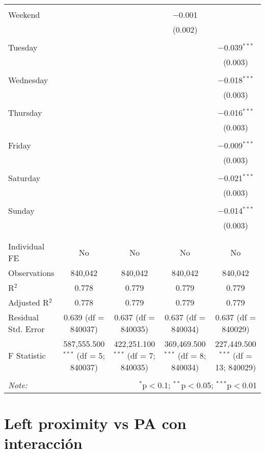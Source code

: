 \documentclass[
]{article}
\begin{document}
\begin{table}[!htbp]
{\begin{tabular}{@{\extracolsep{5pt}}lcccc}
  & & & & \\ 
 Weekend &  &  & $-$0.001 &  \\ 
  &  &  & (0.002) &  \\ 
  & & & & \\ 
 Tuesday &  &  &  & $-$0.039$^{***}$ \\ 
  &  &  &  & (0.003) \\ 
  & & & & \\ 
 Wednesday &  &  &  & $-$0.018$^{***}$ \\ 
  &  &  &  & (0.003) \\ 
  & & & & \\ 
 Thursday &  &  &  & $-$0.016$^{***}$ \\ 
  &  &  &  & (0.003) \\ 
  & & & & \\ 
 Friday &  &  &  & $-$0.009$^{***}$ \\ 
  &  &  &  & (0.003) \\ 
  & & & & \\ 
 Saturday &  &  &  & $-$0.021$^{***}$ \\ 
  &  &  &  & (0.003) \\ 
  & & & & \\ 
 Sunday &  &  &  & $-$0.014$^{***}$ \\ 
  &  &  &  & (0.003) \\ 
  & & & & \\ 
\hline \\[-1.8ex] 
Individual FE & No & No & No & No \\ 
Observations & 840,042 & 840,042 & 840,042 & 840,042 \\ 
R$^{2}$ & 0.778 & 0.779 & 0.779 & 0.779 \\ 
Adjusted R$^{2}$ & 0.778 & 0.779 & 0.779 & 0.779 \\ 
Residual Std. Error & 0.639 (df = 840037) & 0.637 (df = 840035) & 0.637 (df = 840034) & 0.637 (df = 840029) \\ 
F Statistic & 587,555.500$^{***}$ (df = 5; 840037) & 422,251.100$^{***}$ (df = 7; 840035) & 369,469.500$^{***}$ (df = 8; 840034) & 227,449.500$^{***}$ (df = 13; 840029) \\ 
\hline 
\hline \\[-1.8ex] 
\textit{Note:}  & \multicolumn{4}{r}{$^{*}$p$<$0.1; $^{**}$p$<$0.05; $^{***}$p$<$0.01} \\ 
\end{tabular}
} 
\end{table} 
\newpage
\section{Left proximity vs PA con interacción}
\end{document}
